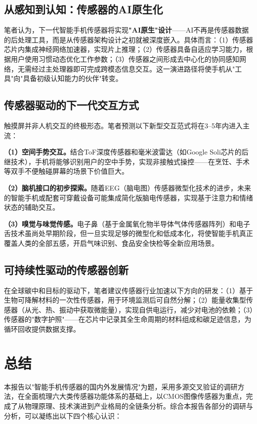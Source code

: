 \documentclass[12pt, a4paper]{ctexart}
\begin{document}
\subsection{从感知到认知：传感器的AI原生化}

笔者认为，下一代智能手机传感器将实现\textbf{"AI原生"设计}——AI不再是传感器数据的后处理工具，而是从传感器架构设计之初就被深度嵌入。具体而言：（1）传感器芯片内集成神经网络加速器，实现片上推理；（2）传感器具备自适应学习能力，根据用户使用习惯动态优化工作参数；（3）传感器之间形成去中心化的协同感知网络，无需经过主处理器即可完成跨模态信息交互。这一演进路径将使手机从"工具"向"具备初级认知能力的伙伴"转变。

\subsection{传感器驱动的下一代交互方式}

触摸屏并非人机交互的终极形态。笔者预测以下新型交互范式将在3--5年内进入主流：

\textbf{（1）空间手势交互。}结合ToF深度传感器和毫米波雷达（如Google Soli芯片的后继技术），手机将能够识别用户的空中手势，实现非接触式操控——在烹饪、手术等双手不便触碰屏幕的场景下价值巨大。

\textbf{（2）脑机接口的初步探索。}随着EEG（脑电图）传感器微型化技术的进步，未来的智能手机或配套可穿戴设备可能集成简化版脑电传感器，实现基于注意力和情绪状态的辅助交互。

\textbf{（3）嗅觉与味觉传感。}电子鼻（基于金属氧化物半导体气体传感器阵列）和电子舌技术虽尚处早期阶段，但一旦实现足够的微型化和低成本化，将使智能手机真正覆盖人类的全部五感，开启气味识别、食品安全快检等全新应用场景。

\subsection{可持续性驱动的传感器创新}

在全球碳中和目标的驱动下，笔者建议传感器行业加速以下方向的研发：（1）基于生物可降解材料的一次性传感器，用于环境监测后可自然分解；（2）能量收集型传感器（从光、热、振动中获取微能量），实现自供电运行，减少对电池的依赖；（3）传感器的"数字护照"——在芯片中记录其全生命周期的材料组成和碳足迹信息，为循环回收提供数据支撑。


\section{总结}

本报告以"智能手机传感器的国内外发展情况"为题，采用多源交叉验证的调研方法，在全面梳理六大类传感器功能体系的基础上，以CMOS图像传感器为重点，完成了从物理原理、技术演进到产业格局的全链条分析。综合本报告各部分的调研与分析，可以凝练出以下四个核心认识：
\end{document}
